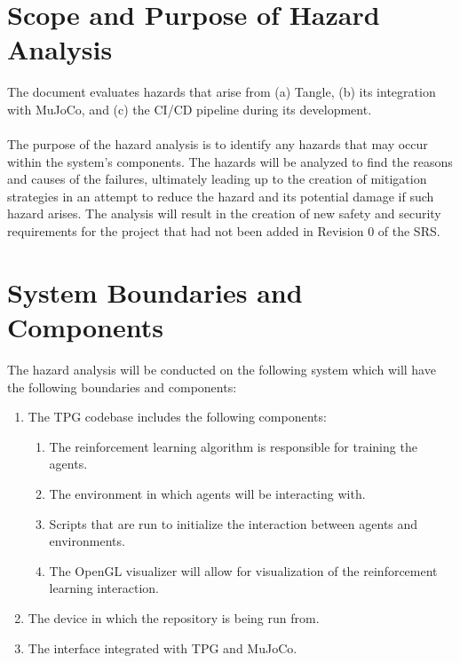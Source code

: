 \documentclass{article}
\begin{document}
\section{Scope and Purpose of Hazard Analysis}


The document evaluates hazards that arise from (a) Tangle, (b) its integration with MuJoCo, and (c) the CI/CD pipeline during its development.
\\\\
The purpose of the hazard analysis is to identify any hazards that may occur within the system's components. The hazards will be analyzed to find the reasons and causes of the failures, ultimately leading up to the creation of mitigation strategies in an attempt to reduce the hazard and its potential damage if such hazard arises. The analysis will result in the creation of new safety and security requirements for the project that had not been added in Revision 0 of the SRS.

\section{System Boundaries and Components}


The hazard analysis will be conducted on the following system which will have the following boundaries and components:
\begin{enumerate}
    \item The TPG codebase includes the following components:
    \begin{enumerate}[label=(\alph*)]
        \item The reinforcement learning algorithm is responsible for training the agents.
        \item The environment in which agents will be interacting with.
        \item Scripts that are run to initialize the interaction between agents and environments.
        \item The OpenGL visualizer will allow for visualization of the reinforcement learning interaction. 
    \end{enumerate}
    \item The device in which the repository is being run from.
    \item The interface integrated with TPG and MuJoCo.
\end{enumerate}
\end{document}
